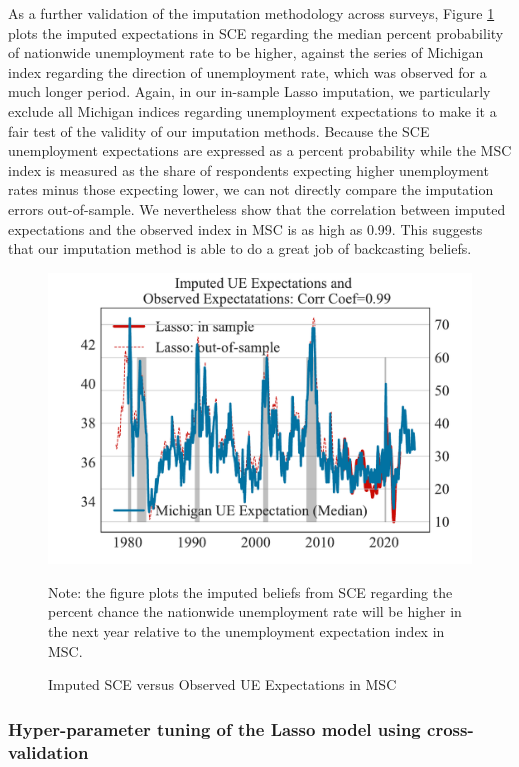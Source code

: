 As a further validation of the imputation methodology across surveys, Figure \ref{fig:impute_cv_with_msc_ue} plots the imputed expectations in SCE regarding the median percent probability of nationwide unemployment rate to be higher, against the series of Michigan index regarding the direction of unemployment rate, which was observed for a much longer period. Again, in our in-sample Lasso imputation, we particularly exclude all Michigan indices regarding unemployment expectations to make it a fair test of the validity of our imputation methods. Because the SCE unemployment expectations are expressed as a percent probability while the MSC index is measured as the share of respondents expecting higher unemployment rates minus those expecting lower, we can not directly compare the imputation errors out-of-sample. We nevertheless show that the correlation between imputed expectations and the observed index in MSC is as high as 0.99. This suggests that our imputation method is able to do a great job of backcasting beliefs.   

 \begin{figure}[pt]
    	\caption{Imputed SCE versus Observed UE Expectations in MSC}
    	\label{fig:impute_cv_with_msc_ue}
    	\begin{center}
	\includegraphics[width=0.6\linewidth]{text/Chapter2/Figures/imputed_comparison_ue_prob_msc_1step.pdf} 
    	\end{center}
    	
    	\begin{flushleft}Note: the figure plots the imputed beliefs from SCE regarding the percent chance the nationwide unemployment rate will be higher in the next year relative to the unemployment expectation index in MSC.\end{flushleft}
    \end{figure}

\subsubsection{Hyper-parameter tuning of the Lasso model using cross-validation}

